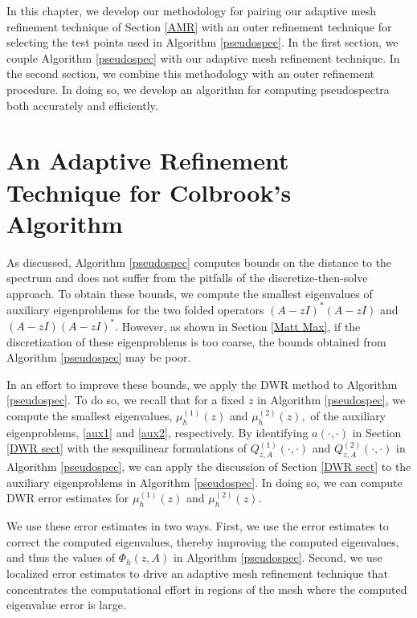 In this chapter, we develop our methodology for pairing our adaptive mesh refinement technique of Section \ref{AMR} with an outer refinement technique for selecting the test points used in Algorithm \ref{pseudospec}. In the first section, we couple Algorithm \ref{pseudospec} with our adaptive mesh refinement technique. In the second section, we combine this methodology with an outer refinement procedure. In doing so, we develop an algorithm for computing pseudospectra both accurately and efficiently. 

\section{ An Adaptive Refinement Technique for Colbrook's Algorithm}

As discussed, Algorithm \ref{pseudospec} computes bounds on the distance to the spectrum and does not suffer from the pitfalls of the discretize-then-solve approach. To obtain these bounds, we compute the smallest eigenvalues of auxiliary eigenproblems for the two folded operators $(A-zI)^*(A-zI)$ and $(A-zI)(A-zI)^*.$ However, as shown in Section \ref{Matt Max}, if the discretization of these eigenproblems is too coarse, the bounds obtained from Algorithm \ref{pseudospec} may be poor. 

In an effort to improve these bounds, we apply the DWR method to Algorithm \ref{pseudospec}.  To do so, we recall that for a fixed $z$ in Algorithm \ref{pseudospec}, we compute the smallest eigenvalues, $\mu_h^{(1)}(z)$ and $\mu_h^{(2)}(z),$ of the auxiliary eigenproblems, \eqref{aux1} and \eqref{aux2}, respectively. By identifying $a(\cdot, \cdot)$ in Section \ref{DWR sect} with the sesquilinear formulations of $Q_{z, A}^{(1)}(\cdot, \cdot)$ and $Q_{z, A}^{(2)}(\cdot, \cdot)$ in Algorithm \ref{pseudospec}, we can apply the discussion of Section \ref{DWR sect} to the auxiliary eigenproblems in Algorithm \ref{pseudospec}. In doing so, we can compute DWR error estimates for $\mu_h^{(1)}(z)$ and $\mu_h^{(2)}(z)$.



We use these error estimates in two ways. First, we use the error estimates to correct the computed eigenvalues, thereby improving the computed eigenvalues, and thus the values of $\Phi_h(z, A)$ in Algorithm \ref{pseudospec}.
Second, we use localized error estimates to drive an adaptive mesh refinement technique that concentrates the computational effort in regions of the mesh where the computed eigenvalue error is large. 

